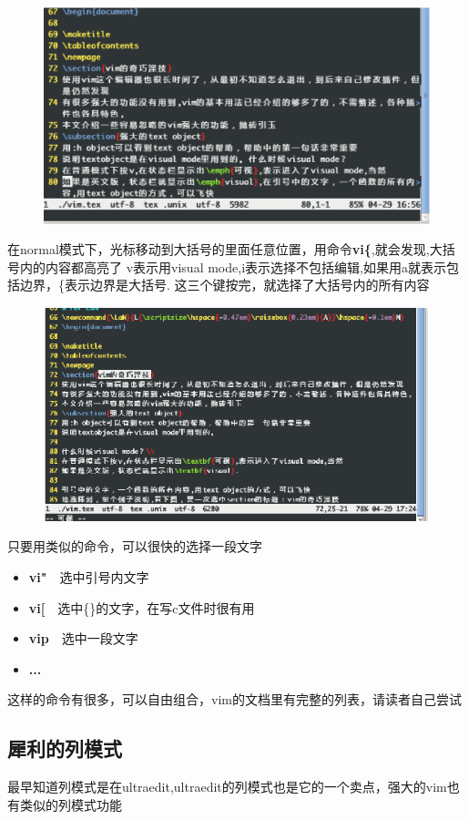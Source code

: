 \documentclass[adobefonts]{ctexart}
\begin{document}
\begin{figure}[htbp]
	\includegraphics[width=12cm]{select.eps}
\end{figure}
在normal模式下，光标移动到大括号的里面任意位置，用命令\textbf{vi\{},就会发现,大括号内的内容都高亮了
v表示用visual mode,i表示选择不包括编辑,如果用a就表示包括边界，\{表示边界是大括号.
这三个键按完，就选择了大括号内的所有内容
\begin{figure}
\includegraphics[width=12cm]{selected.eps}
\end{figure}

只要用类似的命令，可以很快的选择一段文字
\begin{itemize}
\item  \textbf{vi"}~~选中引号内文字
\item  \textbf{vi[}~~选中\{\}的文字，在写c文件时很有用
\item  \textbf{vip}~~选中一段文字
\item  \textbf{...}
\end{itemize}
这样的命令有很多，可以自由组合，vim的文档里有完整的列表，请读者自己尝试
\subsection{犀利的列模式}
最早知道列模式是在ultraedit,ultraedit的列模式也是它的一个卖点，强大的vim也有类似的列模式功能
\end{document}
